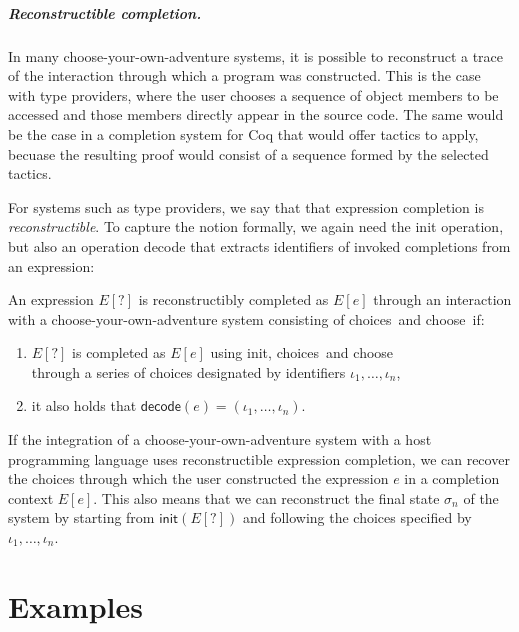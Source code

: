 \documentclass[ a4paper,UKenglish,cleveref, autoref, thm-restate]{lipics-v2021}
\newcommand{\ident}[1]{\textsf{#1}}
\newcommand{\select}{\textnormal{\ident{choose}}}
\newcommand{\choices}{\textnormal{\ident{choices}}}
\begin{document}
\subparagraph{Reconstructible completion.}
In many choose-your-own-adventure systems, it is possible to reconstruct a trace of the interaction
through which a program was constructed. This is the case with type providers, where the user chooses
a sequence of object members to be accessed and those members directly appear in the source code.
The same would be the case in a completion system for Coq that would offer tactics to apply,
becuase the resulting proof would consist of a sequence formed by the selected tactics.

For systems such as type providers, we say that that expression completion is \emph{reconstructible}.
To capture the notion formally, we again need the \ident{init} operation, but also an operation
\ident{decode} that extracts identifiers of invoked completions from an expression:

\begin{definition}
An expression $E[?]$ is reconstructibly completed as $E[e]$ through an interaction with
a choose-your-own-adventure system consisting of \choices\ and \select\ if:

\vspace{-0.5em}
\raggedright
\begin{enumerate}
\item $E[?]$ is completed as $E[e]$ using \ident{init}, \choices\ and \select\\
  through a series of choices designated by identifiers $\iota_1, \ldots, \iota_n$,
\item it also holds that $\ident{decode}(e)=(\iota_1, \ldots, \iota_n)$.
\end{enumerate}
\end{definition}

If the integration of a choose-your-own-adventure system with a host programming language
uses reconstructible expression completion, we can recover the choices through which the user
constructed the expression $e$ in a completion context $E[e]$. This also means that we can
reconstruct the final state $\sigma_n$ of the system by starting from $\ident{init}(E[?])$
and following the choices specified by $\iota_1, \ldots, \iota_n$.


\section{Examples}
\label{sec:examples}
\end{document}
